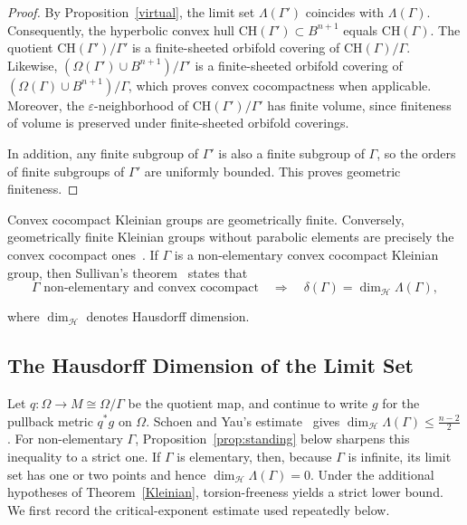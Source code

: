 \documentclass[12pt,oneside,a4paper]{article}
\theoremstyle{mytheorem}
\theoremstyle{remark}
\theoremstyle{definition}
\begin{document}
\begin{proof}
By Proposition~\ref{virtual}, the limit set \( \Lambda(\Gamma') \) coincides with \( \Lambda(\Gamma) \). Consequently, the hyperbolic convex hull \( \mathrm{CH}(\Gamma') \subset B^{n+1} \) equals \( \mathrm{CH}(\Gamma) \). The quotient \( \mathrm{CH}(\Gamma')/\Gamma' \) is a finite-sheeted orbifold covering of \( \mathrm{CH}(\Gamma)/\Gamma \). Likewise, \((\Omega(\Gamma')\cup B^{n+1})/\Gamma'\) is a finite-sheeted orbifold covering of \((\Omega(\Gamma)\cup B^{n+1})/\Gamma\), which proves convex cocompactness when applicable. Moreover, the \( \varepsilon \)-neighborhood of \( \mathrm{CH}(\Gamma')/\Gamma' \) has finite volume, since finiteness of volume is preserved under finite-sheeted orbifold coverings.

In addition, any finite subgroup of \( \Gamma' \) is also a finite subgroup of \( \Gamma \), so the orders of finite subgroups of \( \Gamma' \) are uniformly bounded. This proves geometric finiteness.
\end{proof}



Convex cocompact Kleinian groups are geometrically finite. Conversely, geometrically finite Kleinian groups without parabolic elements are precisely the convex cocompact ones~\cite{MR1218098}. If \(\Gamma\) is a non-elementary convex cocompact Kleinian group, then
Sullivan's theorem~\cite{zbMATH03903608} states that
$$
\Gamma \text{ non-elementary and convex cocompact}
\quad\Longrightarrow\quad
\delta(\Gamma)=\dim_{\mathcal H}\Lambda(\Gamma),
$$

where \(\dim_{\mathcal H}\) denotes Hausdorff dimension.

\subsection{The Hausdorff Dimension of the Limit Set}\label{Hausdorff}

Let \(q\colon\Omega\to M\cong\Omega/\Gamma\) be the quotient map, and
continue to write \(g\) for the pullback metric \(q^*g\) on \(\Omega\).
Schoen and Yau's estimate~\cite[Theorem~4.7]{zbMATH04075988} gives
\(\dim_{\mathcal H}\Lambda(\Gamma)\leq\frac{n-2}{2}\).
For non-elementary \(\Gamma\), Proposition~\ref{prop:standing} below sharpens
this inequality to a strict one. If \(\Gamma\) is elementary, then, because
\(\Gamma\) is infinite, its limit set has one or two points and hence
\(\dim_{\mathcal H}\Lambda(\Gamma)=0\). Under the additional hypotheses of
Theorem~\ref{Kleinian}, torsion-freeness yields a strict lower bound. We first
record the critical-exponent estimate used repeatedly below.
\end{document}

